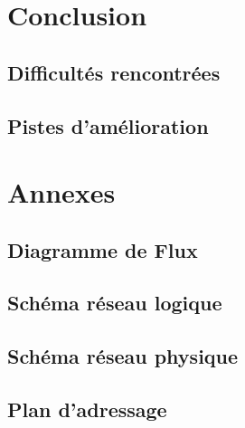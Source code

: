 \documentclass[a4paper,12pt]{report}
\begin{document}
    \chapter{Conclusion}
        \section{Difficultés rencontrées}
        \section{Pistes d'amélioration}

    \chapter*{Annexes}
        \section{Diagramme de Flux}
        \section{Schéma réseau logique}
        \section{Schéma réseau physique}
        \section{Plan d'adressage}
        
\end{document}
